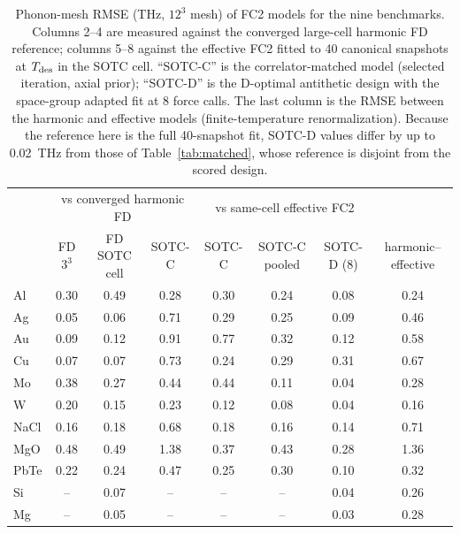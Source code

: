 \begin{table}[t]
\caption{Phonon-mesh RMSE (THz, $12^3$ mesh) of FC2 models for the nine benchmarks. Columns 2--4 are measured against the converged large-cell harmonic FD reference; columns 5--8 against the effective FC2 fitted to 40 canonical snapshots at $T_{\rm des}$ in the SOTC cell. ``SOTC-C'' is the correlator-matched model (selected iteration, axial prior); ``SOTC-D'' is the D-optimal antithetic design with the space-group adapted fit at 8 force calls. The last column is the RMSE between the harmonic and effective models (finite-temperature renormalization). Because the reference here is the full 40-snapshot fit, SOTC-D values differ by up to 0.02~THz from those of Table~\ref{tab:matched}, whose reference is disjoint from the scored design.}
\label{tab:accuracy}
\begin{ruledtabular}
\begin{tabular}{lccccccc}
 & \multicolumn{3}{c}{vs converged harmonic FD} & \multicolumn{3}{c}{vs same-cell effective FC2} & \\
 & FD $3^3$ & FD SOTC cell & SOTC-C & SOTC-C & SOTC-C pooled & SOTC-D (8) & harmonic--effective\\
\hline
Al & 0.30 & 0.49 & 0.28 & 0.30 & 0.24 & 0.08 & 0.24\\
Ag & 0.05 & 0.06 & 0.71 & 0.29 & 0.25 & 0.09 & 0.46\\
Au & 0.09 & 0.12 & 0.91 & 0.77 & 0.32 & 0.12 & 0.58\\
Cu & 0.07 & 0.07 & 0.73 & 0.24 & 0.29 & 0.31 & 0.67\\
Mo & 0.38 & 0.27 & 0.44 & 0.44 & 0.11 & 0.04 & 0.28\\
W & 0.20 & 0.15 & 0.23 & 0.12 & 0.08 & 0.04 & 0.16\\
NaCl & 0.16 & 0.18 & 0.68 & 0.18 & 0.16 & 0.14 & 0.71\\
MgO & 0.48 & 0.49 & 1.38 & 0.37 & 0.43 & 0.28 & 1.36\\
PbTe & 0.22 & 0.24 & 0.47 & 0.25 & 0.30 & 0.10 & 0.32\\
Si & -- & 0.07 & -- & -- & -- & 0.04 & 0.26\\
Mg & -- & 0.05 & -- & -- & -- & 0.03 & 0.28\\
\end{tabular}
\end{ruledtabular}
\end{table}
